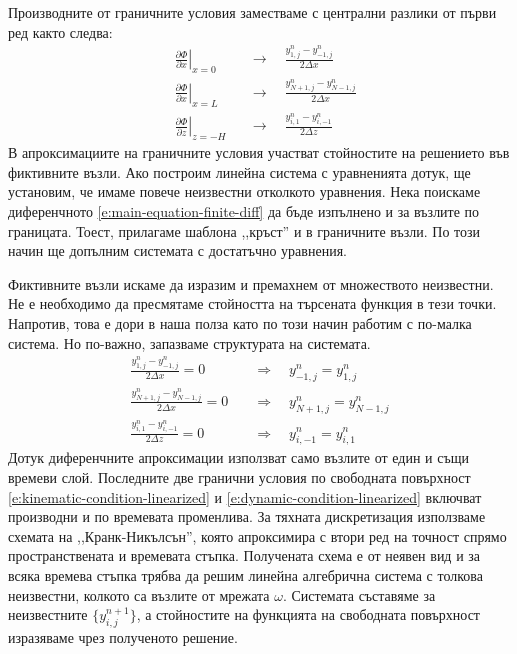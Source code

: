 \documentclass[12pt]{article}
\numberwithin{equation}{section}
\begin{document}
Производните от граничните условия заместваме с централни разлики от първи ред както следва:
\begin{equation}
    \label{e:boundary-conditions-finite-scheme}
    \begin{aligned}
        &\left. \frac{\partial \Phi}{\partial x} \right|_{x=0}
        &&\rightarrow\quad
        \frac{y^n_{1,j} - y^n_{-1,j}}{2\Delta x} \\
        &\left. \frac{\partial \Phi}{\partial x} \right|_{x=L}
        &&\rightarrow\quad
        \frac{y^n_{N+1,j} - y^n_{N-1,j}}{2\Delta x} \\
        &\left. \frac{\partial \Phi}{\partial z} \right|_{z=-H}
        &&\rightarrow\quad
        \frac{y^n_{i,1} - y^n_{i,-1}}{2\Delta z}
    \end{aligned}
\end{equation}
В апроксимациите на граничните условия участват стойностите на решението във фиктивните възли. Ако построим линейна система с уравненията дотук, ще установим, че имаме повече неизвестни отколкото уравнения. Нека поискаме диференчното \autoref{e:main-equation-finite-diff} да бъде изпълнено и за възлите по границата. Тоест, прилагаме шаблона ,,кръст'' и в граничните възли. По този начин ще допълним системата с достатъчно уравнения.

Фиктивните възли искаме да изразим и премахнем от множеството неизвестни. Не е необходимо да пресмятаме стойността на търсената функция в тези точки. Напротив, това е дори в наша полза като по този начин работим с по-малка система. Но по-важно, запазваме структурата на системата.
\begin{equation}
    \label{e:boundary-conditions-finite-difference}
    \begin{aligned}
        \frac{y^n_{1,j} - y^n_{-1,j}}{2\Delta x} = 0 &\quad\Rightarrow\quad y^n_{-1,j} = y^n_{1,j} \\
        \frac{y^n_{N+1,j} - y^n_{N-1,j}}{2\Delta x} = 0 &\quad\Rightarrow\quad y^n_{N+1,j} = y^n_{N-1,j} \\
        \frac{y^n_{i,1} - y^n_{i,-1}}{2\Delta z} = 0 &\quad\Rightarrow\quad y^n_{i,-1} = y^n_{i,1}
    \end{aligned}
\end{equation}
Дотук диференчните апроксимации използват само възлите от един и същи времеви слой. Последните две гранични условия по свободната повърхност \autoref{e:kinematic-condition-linearized} и \autoref{e:dynamic-condition-linearized} включват производни и по времевата променлива. За тяхната дискретизация използваме схемата на ,,Кранк-Никълсън'', която апроксимира с втори ред на точност спрямо пространствената и времевата стъпка. Получената схема е от неявен вид и за всяка времева стъпка трябва да решим линейна алгебрична система с толкова неизвестни, колкото са възлите от мрежата $\omega$. Системата съставяме за неизвестните $\{y^{n+1}_{i,j}\}$, а стойностите на функцията на свободната повърхност изразяваме чрез полученото решение.
\end{document}
